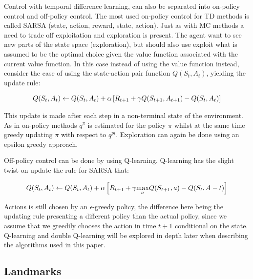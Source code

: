 Control with temporal difference learning, can also be separated into on-policy control and off-policy control. The most used on-policy control for TD methods is called SARSA (state, action, reward, state, action). Just as with MC methods a need to trade off exploitation and exploration is present. The agent want to see new parts of the state space (exploration), but should also use exploit what is assumed to be the optimal choice given the value function associated with the current value function. In this case instead of using the value function instead, consider the case of using the state-action pair function $Q(S_t, A_t)$, yielding the update rule:

\begin{equation}
    Q(S_t, A_t) \leftarrow Q(S_t, A_t) + \alpha \left[ R_{t+1} + \gamma Q(S_{t+1}, A_{t+1}) - Q(S_t, A_t) \right]
\end{equation}

This update is made after each step in a non-terminal state of the environment. As in on-policy methods $q^{\pi}$ is estimated for the policy $\pi$ whilst at the same time greedy updating $\pi$ with respect to $q^{pi}$. Exploration can again be done using an epsilon greedy approach.

Off-policy control can be done by using Q-learning. Q-learning has the slight twist on update the rule for SARSA that:

\begin{equation}
    Q(S_t, A_t) \leftarrow Q(S_t, A_t) + \alpha \left[ R_{t+1} + \gamma \underset{a}{\max} Q(S_{t + 1}, a) - Q(S_t, A-t) \right] 
\end{equation}

Actions is still chosen by an $\epsilon$-greedy policy, the difference here being the updating rule presenting a different policy than the actual policy, since we assume that we greedily chooses the action in time $t+1$ conditional on the state. Q-learning and double Q-learning will be explored in depth later when describing the algorithms used in this paper.

\subsection{Landmarks}

